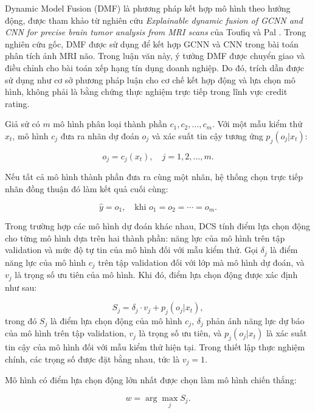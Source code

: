 \documentclass[10pt,twoside]{article}
\begin{document}
Dynamic Model Fusion (DMF) là phương pháp kết hợp mô hình theo hướng động, được tham khảo từ nghiên cứu \textit{Explainable dynamic fusion of GCNN and CNN for precise brain tumor analysis from MRI scans} của Toufiq và Pal \cite{toufiq_explainable_2026}. Trong nghiên cứu gốc, DMF được sử dụng để kết hợp GCNN và CNN trong bài toán phân tích ảnh MRI não. Trong luận văn này, ý tưởng DMF được chuyển giao và điều chỉnh cho bài toán xếp hạng tín dụng doanh nghiệp. Do đó, trích dẫn \cite{toufiq_explainable_2026} được sử dụng như cơ sở phương pháp luận cho cơ chế kết hợp động và lựa chọn mô hình, không phải là bằng chứng thực nghiệm trực tiếp trong lĩnh vực credit rating.

Giả sử có $m$ mô hình phân loại thành phần $c_1,c_2,\ldots,c_m$. Với một mẫu kiểm thử $x_t$, mô hình $c_j$ đưa ra nhãn dự đoán $o_j$ và xác suất tin cậy tương ứng $p_j(o_j|x_t)$:

\begin{equation}
    o_j = c_j(x_t), \quad j=1,2,\ldots,m.
\end{equation}

Nếu tất cả mô hình thành phần đưa ra cùng một nhãn, hệ thống chọn trực tiếp nhãn đồng thuận đó làm kết quả cuối cùng:

\begin{equation}
    \hat{y} = o_1, \quad \text{khi } o_1=o_2=\cdots=o_m.
\end{equation}

Trong trường hợp các mô hình dự đoán khác nhau, DCS tính điểm lựa chọn động cho từng mô hình dựa trên hai thành phần: năng lực của mô hình trên tập validation và mức độ tự tin của mô hình đối với mẫu kiểm thử. Gọi $\delta_j$ là điểm năng lực của mô hình $c_j$ trên tập validation đối với lớp mà mô hình dự đoán, và $v_j$ là trọng số ưu tiên của mô hình. Khi đó, điểm lựa chọn động được xác định như sau:

\begin{equation}
    S_j = \delta_j \cdot v_j + p_j(o_j|x_t),
\end{equation}
trong đó $S_j$ là điểm lựa chọn động của mô hình $c_j$, $\delta_j$ phản ánh năng lực dự báo của mô hình trên tập validation, $v_j$ là trọng số ưu tiên, và $p_j(o_j|x_t)$ là xác suất tin cậy của mô hình đối với mẫu kiểm thử hiện tại. Trong thiết lập thực nghiệm chính, các trọng số được đặt bằng nhau, tức là $v_j=1$.

Mô hình có điểm lựa chọn động lớn nhất được chọn làm mô hình chiến thắng:

\begin{equation}
    w = \arg\max_{j} S_j.
\end{equation}
\end{document}
